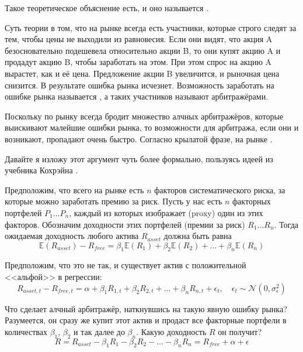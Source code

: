 Такое теоретическое объяснение есть, и оно называется .

Суть теории в том, что на рынке всегда есть участники, которые строго следят за тем, чтобы цены не выходили из равновесия. Если они видят, что акция A безосновательно подешевела относительно акции B, то они купят акцию A и продадут акцию B, чтобы заработать на этом. При этом спрос на акцию A вырастет, как и её цена. Предложение акции B увеличится, и рыночная цена снизится. В результате ошибка рынка исчезнет. Возможность заработать на ошибке рынка называется , а таких участников называют арбитражёрами.

Поскольку по рынку всегда бродит множество алчных арбитражёров, которые выискивают малейшие ошибки рынка, то возможности для арбитража, если они и возникают, пропадают очень быстро. Согласно крылатой фразе, на рынке .

Давайте я изложу этот аргумент чуть более формально, пользуясь идеей из учебника Кохрэйна \cite[p.~180]{cochrane2005asset}.

Предположим, что всего на рынке есть $n$ факторов систематического риска, за которые можно заработать премию за риск. Пусть у нас есть $n$ факторных портфелей $P_1...P_n$, каждый из которых изображает (proxy) один из этих факторов. Обозначим доходности этих портфелей (премии за риск) $R_1...R_n$. Тогда ожидаемая доходность любого актива $R_{asset}$ должна быть равна
\begin{equation}
\mathbb{E}(R_{asset}) - R_{free} = \beta_1\mathbb{E}(R_1) + \beta_2\mathbb{E}(R_2) + ... + \beta_n\mathbb{E}(R_n)
\label{apt_equation}
\end{equation}

Предположим, что это не так, и существует актив с положительной <<альфой>> в регрессии:\begin{equation}
R_{asset,t} - R_{free,t} = \alpha + \beta_1R_{1,t} + \beta_2R_{2,t} + ... + \beta_nR_{n,t} + \epsilon_t, \quad \epsilon_t \sim \mathcal{N}(0, \sigma_{\epsilon}^2)
\label{apt_regression_example}
\end{equation}

Что сделает алчный арбитражёр, наткнувшись на такую явную ошибку рынка? Разумеется, он сразу же купит этот актив и продаст все факторные портфели в количествах $\beta_1$, $\beta_2$ и так далее до $\beta_n$. Какую доходность $R$ он получит?
\begin{equation*}
R = R_{asset} - \beta_1R_{1} - \beta_2R_{2} - ... - \beta_nR_{n} = R_{free} + \alpha + \epsilon
\end{equation*}

